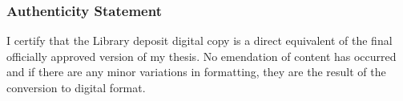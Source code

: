 {\cleardoublepage
\vspace*{1in}
\subsubsection*{Authenticity Statement}

I certify that the Library deposit digital copy is a direct equivalent
of the final officially approved version of my thesis. No emendation of content
has occurred and if there are any minor variations in formatting, they are the
result of the conversion to digital format.

\vspace{5mm}
\noindent{}

} %


